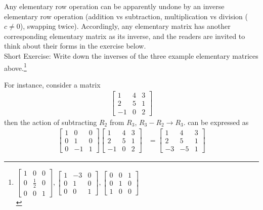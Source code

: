 Any elementary row operation can be apparently undone by an inverse elementary row operation (addition vs subtraction, multiplication vs division ($c \neq 0$), swapping twice). Accordingly, any elementary matrix has another corresponding elementary matrix as its inverse, and the readers are invited to think about their forms in the exercise below. \\
Short Exercise: Write down the inverses of the three example elementary matrices above.\footnote{$
\begin{bmatrix}
1 & 0 & 0 \\
0 & \frac{1}{2} & 0 \\
0 & 0 & 1
\end{bmatrix},
\begin{bmatrix}
1 & -3 & 0 \\
0 & 1 & 0 \\
0 & 0 & 1
\end{bmatrix},
\begin{bmatrix}
0 & 0 & 1 \\
0 & 1 & 0 \\
1 & 0 & 0
\end{bmatrix}
$\\}\par
For instance, consider a matrix
\begin{align*}
\begin{bmatrix}
1 & 4 & 3 \\
2 & 5 & 1 \\
-1 & 0 & 2
\end{bmatrix}     
\end{align*}
then the action of subtracting $R_2$ from $R_3$, $R_3 - R_2 \to R_3$. can be expressed as
\begin{align*}
\begin{bmatrix}
1 & 0 & 0 \\
0 & 1 & 0 \\
0 & -1 & 1
\end{bmatrix} 
\begin{bmatrix}
1 & 4 & 3 \\
2 & 5 & 1 \\
-1 & 0 & 2
\end{bmatrix} 
&= 
\begin{bmatrix}
1 & 4 & 3 \\
2 & 5 & 1 \\
-3 & -5 & 1
\end{bmatrix} 
\end{align*}
